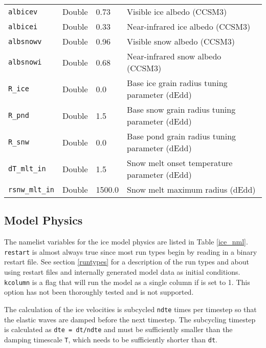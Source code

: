 \begin{table}
\begin{center}
\begin{tabular}{p{3cm}p{2.0cm}p{3cm}p{6.5cm}}
{\tt albicev} &  Double & 0.73 &  Visible ice albedo (CCSM3)\\

{\tt albicei} &  Double & 0.33 &  Near-infrared ice albedo (CCSM3)\\

{\tt albsnowv} &  Double & 0.96 &  Visible snow albedo (CCSM3)\\

{\tt albsnowi} &  Double & 0.68 &  Near-infrared snow albedo (CCSM3)\\

{\tt R\_ice} &  Double & 0.0 &  Base ice grain radius tuning parameter (dEdd)\\

{\tt R\_pnd} &  Double & 1.5 &  Base snow grain radius tuning parameter (dEdd)\\

{\tt R\_snw} &  Double & 0.0 &  Base pond grain radius tuning parameter (dEdd)\\

{\tt dT\_mlt\_in} &  Double & 1.5 & Snow melt onset temperature parameter (dEdd)\\

{\tt rsnw\_mlt\_in} &  Double & 1500.0 & Snow melt maximum radius (dEdd)\\

  \hline
  \end{tabular}
  \end{center}
\end{table}

\subsection{Model Physics}

The namelist variables for the ice model physics are listed in Table 
\ref{ice_nml}.  {\tt restart} is almost always true since most
run types begin by reading in a binary restart file.  See section 
\ref{runtypes} for a description of the run types and about using
restart files and internally generated model data as initial conditions.
{\tt kcolumn} is a flag that will run the model as a single column if is
set to 1.  This option has not been thoroughly tested and is not supported. 

The calculation of the ice velocities is subcycled {\tt ndte} times per
timestep so that the elastic waves are damped before the next timestep. The
subcycling timestep is calculated as {\tt dte = dt/ndte}
and must be sufficiently smaller than the damping timescale {\tt T},
which needs to be sufficiently shorter than {\tt dt}.


